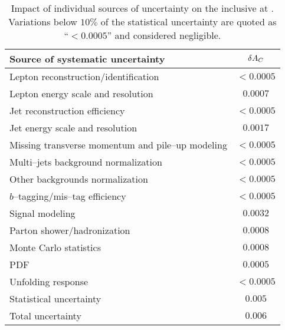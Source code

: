 \begin{table}[!htb]\centering
\begin{tabular}{l c}
\toprule
Source of systematic uncertainty  & $\delta{\ensuremath{A_C}{}}$ \\
\midrule
Lepton reconstruction/identification    & $<0.0005$\\
Lepton energy scale and resolution      &  $0.0007$\\
Jet reconstruction efficiency                 &  $<0.0005$ \\
Jet energy scale and resolution             &  $0.0017$ \\
Missing transverse momentum and pile--up modeling& $<0.0005$\\
Multi--jets background normalization & $<0.0005$\\
Other backgrounds normalization        & $<0.0005$\\
$b$--tagging/mis--tag efficiency       & $<0.0005$\\
Signal modeling                                    & $0.0032$\\
Parton shower/hadronization                & $0.0008$\\
Monte Carlo statistics                            & $0.0008$\\
PDF                                                        &$0.0005$\\
Unfolding response                               &$<0.0005$\\
\midrule
Statistical uncertainty                           & $0.005$ \\
\midrule
Total uncertainty                                   & $0.006$ \\
\bottomrule
\end{tabular}
\caption{
  Impact of individual sources of uncertainty on the inclusive
  \ac{} at \eighttev{}. Variations below $10\%$ of the statistical
  uncertainty are quoted as ``$<0.0005$'' and considered negligible.}
\label{tab:8tevsystematics}
\end{table}

